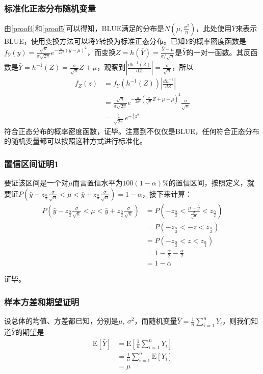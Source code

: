 \documentclass[UTF8]{ctexbook}
\begin{document}
\subsubsection{标准化正态分布随机变量}
\label{proof6}
由\ref{proof4}和\ref{proof5}可以得知，BLUE满足的分布是$N(\mu, \frac{\sigma^2}{n})$，此处使用$\bar Y$来表示BLUE，使用变换方法可以将$\bar Y$转换为标准正态分布。已知$\bar Y$的概率密度函数是$f_{\bar Y}(y)=\frac{\sqrt{n}}{\sigma\sqrt{2\pi}}e^{-\frac{n}{2\sigma^2}(y-\mu)^2}$，而变换$Z=h(\bar Y)=\frac{\bar Y-\mu}{\sigma/\sqrt{n}}$是$\bar Y$的一对一函数。其反函数是$\bar Y=h^{-1}(Z)=\frac{\sigma}{\sqrt n}Z+\mu$，观察到$\left|\frac{\mathrm dh^{-1}(Z)}{\mathrm dZ}\right|=\frac{\sigma}{\sqrt n}$，所以
\begin{align*}
	f_Z(z)&=f_Y(h^{-1}(Z))\left|\frac{dh^{-1}}{dZ}\right|\\
	&=\frac{\sqrt{n}}{\sigma\sqrt{2\pi}}e^{-\frac{n}{2\sigma^2}(\frac{\sigma}{\sqrt n}Z+\mu-\mu)^2}\frac{\sigma}{\sqrt n}\\
	&=\frac{1}{\sqrt{2\pi}}e^{-\frac{1}{2}z^2}
\end{align*}
符合正态分布的概率密度函数，证毕。注意到不仅仅是BLUE，任何符合正态分布的随机变量都可以按照这种方式进行标准化。
\subsubsection{置信区间证明1}
\label{proof7}
要证该区间是一个对$\mu$而言置信水平为$100(1-\alpha)\%$的置信区间，按照定义，就要证$P(\bar y-z_{\frac{\alpha}{2}}\frac{\sigma}{\sqrt n}<\mu<\bar y+z_{\frac{\alpha}{2}}\frac{\sigma}{\sqrt n})=1-\alpha$，接下来计算：
\begin{align*}
	P(\bar y-z_{\frac{\alpha}{2}}\frac{\sigma}{\sqrt n}<\mu<\bar y+z_{\frac{\alpha}{2}}\frac{\sigma}{\sqrt n})&=P(-z_\frac{\alpha}{2}<\frac{\mu-\bar y}{\frac{\sigma}{\sqrt n}}<z_\frac{\alpha}{2})\\
	&=P(-z_\frac{\alpha}{2}<-z<z_\frac{\alpha}{2})\\
	&=P(-z_\frac{\alpha}{2}<z<z_\frac{\alpha}{2})\\
	&=1-\frac{\alpha}{2}-\frac{\alpha}{2}\\
	&=1-\alpha
\end{align*}

证毕。

\subsubsection{样本方差和期望证明}
\label{proof8}
设总体的均值、方差都已知，分别是$\mu,\ \sigma^2$，而随机变量$\bar Y=\frac{1}{n}\sum_{i=1}^nY_i$，则我们知道$\bar Y$的期望是
\begin{align*}
	\mathrm E[\bar Y]&=\mathrm E[\frac{1}{n}\sum_{i=1}^nY_i]\\
	&=\frac{1}{n}\sum_{i=1}^n\mathrm E[Y_i]\\
	&=\mu
\end{align*}
\end{document}
